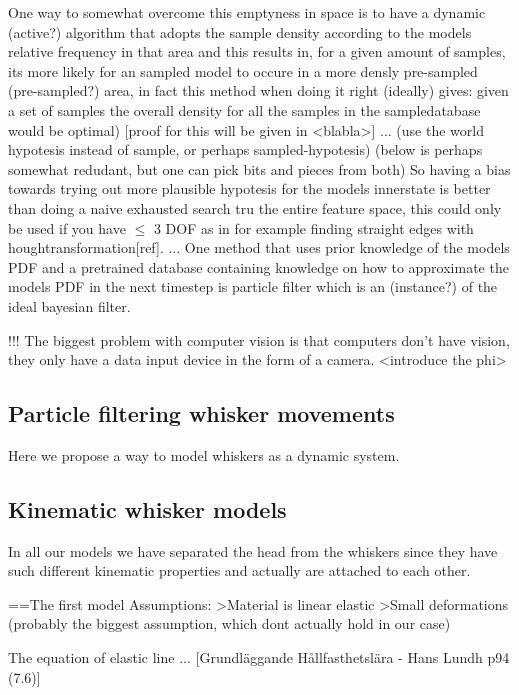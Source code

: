 One way to somewhat overcome this emptyness in space is to have a dynamic (active?) algorithm that adopts the sample density 
according to the models relative frequency in that area and this results in, for a given amount of samples, its more likely 
for an sampled model to occure in a more densly pre-sampled (pre-sampled?) area, in fact this method when doing it right (ideally) 
gives: given a set of samples the overall density for all the samples in the sampledatabase would be optimal) [proof for this will be given in <blabla>]
... (use the world hypotesis instead of sample, or perhaps sampled-hypotesis)
(below is perhaps somewhat redudant, but one can pick bits and pieces from both)
So having a bias towards trying out more plausible hypotesis for the models innerstate is better than 
doing a naive exhausted search tru the entire feature space, this could only be used if you have $\le$ 3 DOF as in for example finding straight edges with houghtransformation[ref].
...
One method that uses prior knowledge of the models PDF and a pretrained database containing knowledge on how to approximate the models PDF in the next timestep is particle filter which is an (instance?) of the ideal bayesian filter.





!!!
The biggest problem with computer vision is that computers don't have vision,
they only have a data input device in the form of a camera. <introduce the
phi>






\subsection{Particle filtering whisker movements}
Here we propose a way to model whiskers as a dynamic system.

\subsection{Kinematic whisker models}

In all our models we have separated the head from the whiskers since they have
such different kinematic properties and actually are attached to each other.

==The first model
Assumptions:
>Material is linear elastic
>Small deformations (probably the biggest assumption, which dont actually hold
in our case)

The equation of elastic line ... [Grundläggande Hållfasthetslära - Hans Lundh
p94 (7.6)]

